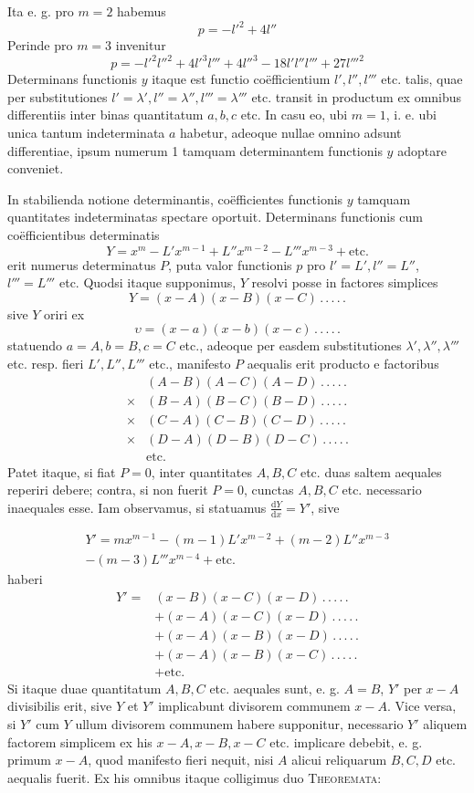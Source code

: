 Ita e. g. pro $m=2$ habemus
\[
p=-{l'}^2+4l''
\]
Perinde pro $m=3$ invenitur
\[
p=-{l'}^2{l''}^2+4{l'}^3l'''+4{l''}^3-18l'l''l'''+27{l'''}^2
\]
Determinans functionis $y$ itaque est functio coëfficientium $l',l'',l'''$ etc. talis,
quae per substitutiones $l'=\lambda',l''=\lambda'',l'''=\lambda'''$ etc. transit in productum ex
omnibus differentiis inter binas quantitatum $a,b,c$ etc. In casu eo, ubi $m=1$,
i. e. ubi unica tantum indeterminata $a$ habetur, adeoque nullae omnino adsunt
differentiae, ipsum numerum 1 tamquam determinantem functionis $y$ adoptare
conveniet.

In stabilienda notione determinantis, coëfficientes functionis $y$ tamquam
quantitates indeterminatas spectare oportuit. Determinans functionis cum coëfficientibus determinatis
\[
Y=x^m-L'x^{m-1}+L''x^{m-2}-L'''x^{m-3}+\text{etc.}
\]
erit numerus determinatus $P$, puta valor functionis $p$ pro $l'=L',l''=L''$,
$l'''=L'''$ etc. Quodsi itaque supponimus, $Y$ resolvi posse in factores simplices
\[
Y=(x-A)(x-B)(x-C)\, .\, .\, .\, .\, .
\]
sive $Y$ oriri ex
\[
\upsilon=(x-a)(x-b)(x-c)\, .\, .\, .\, .\, .
\]
statuendo $a=A,b=B,c=C$ etc., adeoque per easdem substitutiones $\lambda',\lambda'',\lambda'''$ etc.
resp. fieri $L',L'',L'''$ etc., manifesto $P$ aequalis erit producto e factoribus
\[
\begin{aligned}
&(A-B)(A-C)(A-D)\, .\, .\, .\, .\, .\\
\times{}&(B-A)(B-C)(B-D)\, .\, .\, .\, .\, .\\
\times{}&(C-A)(C-B)(C-D)\, .\, .\, .\, .\, .\\
\times{}&(D-A)(D-B)(D-C)\, .\, .\, .\, .\, .\\
&\text{etc.}
\end{aligned}
\]
Patet itaque, si fiat $P=0$, inter quantitates $A,B,C$ etc. duas saltem aequales reperiri debere; contra, si non fuerit $P=0$, cunctas $A,B,C$ etc. necessario inaequales esse. Iam observamus, si statuamus $\frac{\mathrm dY}{\mathrm dx}=Y'$, sive

\[
\begin{gathered}Y'=mx^{m-1}-(m-1)L'x^{m-2}+(m-2)L''x^{m-3}\\-(m-3)L'''x^{m-4}+\text{etc.}\end{gathered}
\]
haberi
\[
\begin{aligned}
Y'={}&(x-B)(x-C)(x-D)\, .\, .\, .\, .\, .\\
&+(x-A)(x-C)(x-D)\, .\, .\, .\, .\, .\\
&+(x-A)(x-B)(x-D)\, .\, .\, .\, .\, .\\
&+(x-A)(x-B)(x-C)\, .\, .\, .\, .\, .\\
&+\text{etc.}
\end{aligned}
\]
Si itaque duae quantitatum $A,B,C$ etc. aequales sunt, e. g. $A=B$, $Y'$ per
$x-A$ divisibilis erit, sive $Y$ et $Y'$ implicabunt divisorem communem $x-A$.
Vice versa, si $Y'$ cum $Y$ ullum divisorem communem habere supponitur, necessario $Y'$ aliquem factorem simplicem ex his $x-A,x-B,x-C$ etc. implicare
debebit, e. g. primum $x-A$, quod manifesto fieri nequit, nisi $A$ alicui reliquarum $B,C,D$ etc. aequalis fuerit. Ex his omnibus itaque colligimus duo
\textsc{Theoremata}:

